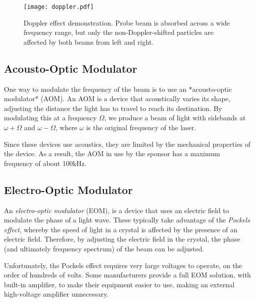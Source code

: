 \begin{figure}
    \centering
    \label{fig:doppler}
    \texttt{[image: doppler.pdf]}
    \caption{Doppler effect demonstration.  Probe beam is absorbed across a wide frequency range, but only the non-Doppler-shifted particles are affected by both beams from left and right.}
\end{figure}

\subsection{Acousto-Optic Modulator}

One way to modulate the frequency of the beam is to use an *acousto-optic modulator* (AOM).  An AOM is a device that acoustically varies its shape, adjusting the distance the light has to travel to reach its destination.  By modulating this at a frequency $\Omega$, we produce a beam of light with sidebands at $\omega + \Omega$ and $\omega - \Omega$, where $\omega$ is the original frequency of the laser.

Since these devices use acoustics, they are limited by the mechanical properties of the device.  As a result, the AOM in use by the sponsor has a maximum frequency of about 100kHz.

\subsection{Electro-Optic Modulator}

An \emph{electro-optic modulator} (EOM), is a device that uses an electric field to modulate the phase of a light wave.  These typically take advantage of the \emph{Pockels effect}, whereby the speed of light in a crystal is affected by the presence of an electric field.  Therefore, by adjusting the electric field in the crystal, the phase (and ultimately frequency spectrum) of the beam can be adjusted.

Unfortunately, the Pockels effect requires very large voltages to operate, on the order of hundreds of volts.  Some manufacturers provide a full EOM solution, with built-in amplifier, to make their equipment easier to use, making an external high-voltage amplifier unnecessary.


